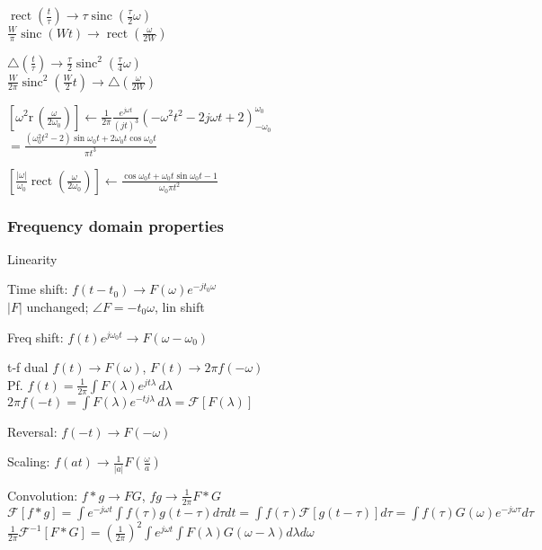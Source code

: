 \documentclass[4pt]{article}
\theoremstyle{definition}
\theoremstyle{definition}
\renewcommand{\r}{\mathrm{r}\,}
\renewcommand{\o}{\omega}
\newcommand{\ra}{\rightarrow}
\DeclareMathOperator{\rect}{rect}
\DeclareMathOperator{\sinc}{sinc}
\begin{document}
    $\rect(\frac t {\tau}) \ra \tau \sinc(\frac{\tau}{2}\omega)$\\ 
    $\frac W \pi \sinc(Wt) \ra \rect(\frac{\omega}{2W})$

    \(\triangle (\frac t {\tau}) \ra \frac{\tau}{2} \sinc^2 (\frac{\tau}{4}\omega)\)\\
    \(\frac{W}{2\pi} \sinc^2 (\frac{W}{2}t) \ra \triangle(\frac{\omega}{2W})\)

    \([\o^2 \r(\frac{\o}{2\o_0})] \leftarrow \frac{1}{2\pi} \frac{e^{j\o t}}{(jt)^3}(-\o^2t^2-2j\o t + 2)^{\o_0}_{-\o_0}\)\\
    \(=\frac{(\o_0^2 t^2 - 2)\sin \o_0 t + 2\o_0 t\cos \o_0 t}{\pi t^3}\)\

    \([\frac{|\o|}{\o_0} \rect(\frac{\o}{2\o_0})] \leftarrow \frac{\cos \o_0 t + \o_0 t \sin \o_0 t - 1}{\o_0 \pi t^2}\)
\subsubsection{Frequency domain properties}
    Linearity

    Time shift: \(f(t-t_0) \ra F(\omega) e^{-jt_0\omega}\) \\ %
    $|F|$ unchanged; $\angle F =- t_0\omega$, lin shift

    Freq shift: \(f(t) e^{j\omega_0 t} \ra F(\omega - \omega_0)\)  %

    t-f dual \(f(t) \ra F(\omega)\), \(F(t) \ra 2\pi f(-\omega)\)\\ 
    Pf. \(f(t) = \frac 1 {2\pi} \int F(\lambda) e^{jt\lambda}\, d\lambda\)\\
    \(2\pi f(-t) = \int F(\lambda) e^{-tj\lambda}\, d\lambda = \mathcal{F}[F(\lambda)]\)

    Reversal: \(f(-t)\ra F(-\o)\)

    Scaling: \(f(at)\ra \frac{1}{|a|}F(\frac{\o}{a})\)   %

    Convolution: \(f*g \ra FG\), \(fg \ra \frac{1}{2\pi} F*G\)\\
    \(\mathcal F[f*g] = \int e^{-j\o t} \int f(\tau) g(t-\tau)d\tau dt =\int f(\tau) \mathcal F[g(t-\tau)]  d\tau = \int f(\tau) G(\o)e^{-j\o\tau}d\tau\)\\
    \( \frac{1}{2\pi} \mathcal{F}^{-1}[F * G] = (\frac{1}{2\pi})^2 \int e^{j\o t} \int F(\lambda) G(\o - \lambda) d\lambda d\o\)
\end{document}
